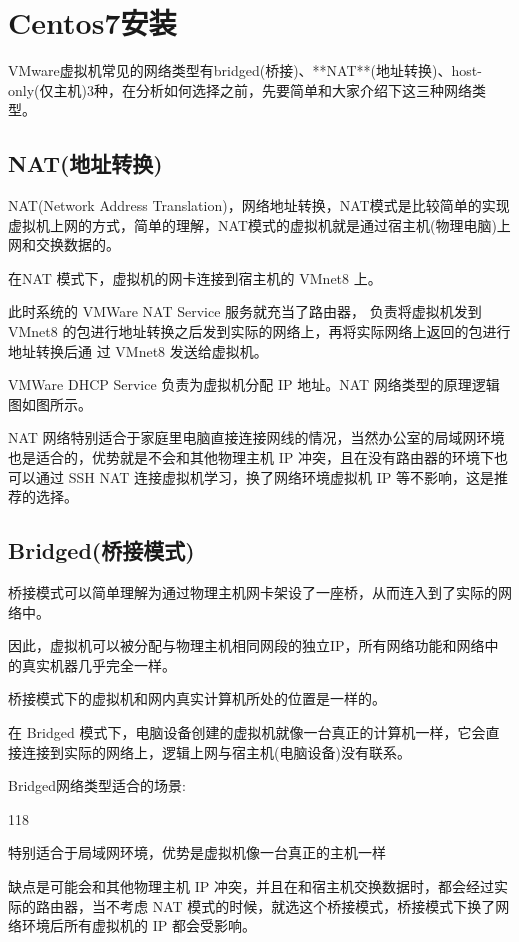 \section{Centos7安装}
VMware虚拟机常见的网络类型有bridged(桥接)、**NAT**(地址转换)、host-only(仅主机)3种，在分析如何选择之前，先要简单和大家介绍下这三种网络类型。

\subsection{NAT(地址转换)}
NAT(Network Address Translation)，网络地址转换，NAT模式是比较简单的实现虚拟机上网的方式，简单的理解，NAT模式的虚拟机就是通过宿主机(物理电脑)上网和交换数据的。

在NAT 模式下，虚拟机的网卡连接到宿主机的 VMnet8 上。

此时系统的 VMWare NAT Service 服务就充当了路由器， 负责将虚拟机发到 VMnet8 的包进行地址转换之后发到实际的网络上，再将实际网络上返回的包进行地址转换后通 过 VMnet8 发送给虚拟机。

VMWare DHCP Service 负责为虚拟机分配 IP 地址。NAT 网络类型的原理逻辑图如图所示。

NAT 网络特别适合于家庭里电脑直接连接网线的情况，当然办公室的局域网环境也是适合的，优势就是不会和其他物理主机 IP 冲突，且在没有路由器的环境下也可以通过 SSH NAT 连接虚拟机学习，换了网络环境虚拟机 IP 等不影响，这是推荐的选择。

\subsection{Bridged(桥接模式)}

桥接模式可以简单理解为通过物理主机网卡架设了一座桥，从而连入到了实际的网络中。

因此，虚拟机可以被分配与物理主机相同网段的独立IP，所有网络功能和网络中的真实机器几乎完全一样。

桥接模式下的虚拟机和网内真实计算机所处的位置是一样的。

在 Bridged 模式下，电脑设备创建的虚拟机就像一台真正的计算机一样，它会直接连接到实际的网络上，逻辑上网与宿主机(电脑设备)没有联系。

Bridged网络类型适合的场景:
\begin{dinglist}{118}
\item 特别适合于局域网环境，优势是虚拟机像一台真正的主机一样
\item 缺点是可能会和其他物理主机 IP 冲突，并且在和宿主机交换数据时，都会经过实际的路由器，当不考虑 NAT 模式的时候，就选这个桥接模式，桥接模式下换了网络环境后所有虚拟机的 IP 都会受影响。
\end{dinglist}
